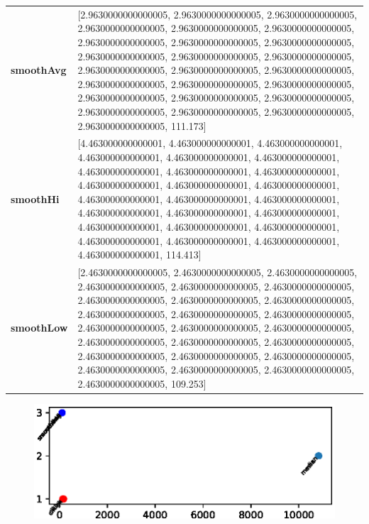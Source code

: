 		\begin{table}[H]
			\centering
			\begin{tabularx}{\textwidth}{lX}
		  \textbf{smoothAvg}&  [2.9630000000000005, 2.9630000000000005, 2.9630000000000005, 2.9630000000000005, 2.9630000000000005, 2.9630000000000005, 2.9630000000000005, 2.9630000000000005, 2.9630000000000005, 2.9630000000000005, 2.9630000000000005, 2.9630000000000005, 2.9630000000000005, 2.9630000000000005, 2.9630000000000005, 2.9630000000000005, 2.9630000000000005, 2.9630000000000005, 2.9630000000000005, 2.9630000000000005, 2.9630000000000005, 2.9630000000000005, 2.9630000000000005, 2.9630000000000005, 2.9630000000000005, 111.173] \\
		\textbf{smoothHi}& [4.463000000000001, 4.463000000000001, 4.463000000000001, 4.463000000000001, 4.463000000000001, 4.463000000000001, 4.463000000000001, 4.463000000000001, 4.463000000000001, 4.463000000000001, 4.463000000000001, 4.463000000000001, 4.463000000000001, 4.463000000000001, 4.463000000000001, 4.463000000000001, 4.463000000000001, 4.463000000000001, 4.463000000000001, 4.463000000000001, 4.463000000000001, 4.463000000000001, 4.463000000000001, 4.463000000000001, 4.463000000000001, 114.413] \\
		\textbf{smoothLow} &[2.4630000000000005, 2.4630000000000005, 2.4630000000000005, 2.4630000000000005, 2.4630000000000005, 2.4630000000000005, 2.4630000000000005, 2.4630000000000005, 2.4630000000000005, 2.4630000000000005, 2.4630000000000005, 2.4630000000000005, 2.4630000000000005, 2.4630000000000005, 2.4630000000000005, 2.4630000000000005, 2.4630000000000005, 2.4630000000000005, 2.4630000000000005, 2.4630000000000005, 2.4630000000000005, 2.4630000000000005, 2.4630000000000005, 2.4630000000000005, 2.4630000000000005, 109.253]\\
		
	\end{tabularx} 
\end{table}



\begin{figure}[]
\centering
\includegraphics[width=1\linewidth]{illustrations/2018-01-0202:04:21}
\caption{}
\label{fig:2018-01-0202:04:21}
\end{figure}

